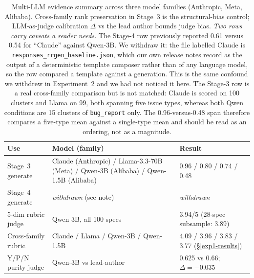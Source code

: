 \documentclass[11pt]{article}
\begin{document}
\begin{table}[t]\centering\footnotesize

\begin{tabular}{@{}p{2.7cm}p{2.9cm}p{2.4cm}@{}}\toprule
Use & Model (family) & Result \\\midrule
Stage~3 generate & Claude (Anthropic) / Llama-3.3-70B (Meta) / Qwen-3B (Alibaba) / Qwen-1.5B (Alibaba) & 0.96 / 0.80 / 0.74 / 0.48 \\
Stage~4 generate & \emph{withdrawn} (see note) & \emph{withdrawn} \\
5-dim rubric judge & Qwen-3B, all 100 specs & 3.94/5 (28-spec subsample: 3.89) \\
Cross-family rubric & Claude / Llama / Qwen-3B / Qwen-1.5B & 4.09 / 3.96 / 3.83 / 3.77 (\S\ref{exp1-results}) \\
Y/P/N purity judge & Qwen-3B vs lead-author & 0.625 vs 0.66; $\Delta=-0.035$ \\
\bottomrule\end{tabular}
\caption{Multi-LLM evidence summary across three model families (Anthropic, Meta, Alibaba).
Cross-family rank preservation in Stage~3 is the structural-bias control; LLM-as-judge
calibration $\Delta$ vs the lead author bounds judge bias. \emph{Two rows carry caveats a reader
needs.} The Stage-4 row previously reported 0.61 versus 0.54 for ``Claude'' against Qwen-3B. We
withdraw it: the file labelled Claude is \texttt{responses\_rrgen\_baseline.json}, which our own
release notes record as the output of a deterministic template composer rather than of any
language model, so the row compared a template against a generation. This is the same confound we
withdrew in Experiment~2 and we had not noticed it here. The Stage-3 row is a real cross-family
comparison but is not matched: Claude is scored on 100 clusters and Llama on 99, both spanning
five issue types, whereas both Qwen conditions are 15 clusters of \texttt{bug\_report} only. The
0.96-versus-0.48 span therefore compares a five-type mean against a single-type mean and should be
read as an ordering, not as a magnitude.}\label{tab:multi-llm}\end{table}
\end{document}
